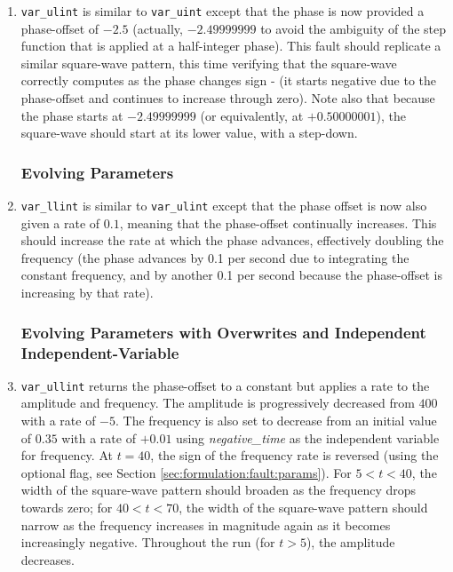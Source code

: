 \documentclass[11pt,fleqn]{report}
\begin{document}
\begin{enumerate}
\subsubsection{Offset Parameter / Zero-crossing}
 \item \verb'var_ulint' is similar to  \verb'var_uint' except that the phase
   is now provided a phase-offset of $-2.5$ (actually, $-2.49999999$ to avoid
   the ambiguity of the step function that is applied at a half-integer phase).
   This fault should replicate a similar square-wave pattern, this time
   verifying that the square-wave correctly computes as the phase changes sign -
   (it starts negative due to the phase-offset and continues to increase through
   zero).
   Note also that because the phase starts at $-2.49999999$ (or equivalently,
   at $+0.50000001$), the square-wave should start at its lower value, with a
   step-down.

\subsubsection{Evolving Parameters}
 \item \verb'var_llint' is similar to  \verb'var_ulint' except that the phase
   offset is now also given a rate of $0.1$, meaning that the phase-offset
   continually increases. This should increase the rate at which the phase
   advances, effectively doubling the frequency (the phase advances by 0.1 per
   second due to integrating the constant frequency, and by another 0.1 per
   second because the phase-offset is increasing by that rate).

\subsubsection{Evolving Parameters with Overwrites and Independent
               Independent-Variable}
 \item \verb'var_ullint' returns the phase-offset to a constant but applies a
   rate to the amplitude and frequency. The amplitude is progressively decreased
   from $400$ with a rate of $-5$. The frequency is also set to decrease from an
   initial value of $0.35$ with a rate of $+0.01$ using
   \textit{negative\_time} as the independent variable for frequency.
   At $t=40$, the sign of the frequency rate is reversed (using the
   optional flag, see Section \ref{sec:formulation:fault:params}).
   For $5<t<40$, the width of the square-wave pattern should broaden as the
   frequency drops towards zero; for $40<t<70$, the width of the
   square-wave pattern should narrow as the frequency increases in magnitude
   again as it becomes increasingly negative.
   Throughout the run (for $t>5$), the amplitude decreases.


\end{enumerate}
\end{document}
